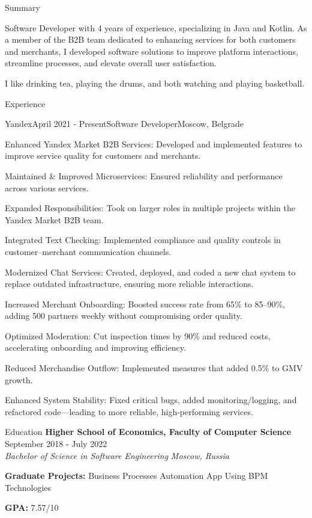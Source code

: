 \documentclass[
	11pt, %
]{resume} %
\begin{document}
	
\begin{rSection}{Summary}
	
Software Developer with 4 years of experience, specializing in Java and Kotlin. As a member of the B2B team dedicated to enhancing services for both customers and merchants, I developed software solutions to improve platform interactions, streamline processes, and elevate overall user satisfaction.

I like drinking tea, playing the drums, and both watching and playing basketball.
\end{rSection}

\begin{rSection}{Experience}

\begin{rSubsection}{Yandex}{April 2021 - Present}{Software Developer}{Moscow, Belgrade}
	\item Enhanced Yandex Market B2B Services: Developed and implemented features to improve service quality for customers and merchants.
	\item Maintained \& Improved Microservices: Ensured reliability and performance across various services.
	\item Expanded Responsibilities: Took on larger roles in multiple projects within the Yandex Market B2B team.
	\item Integrated Text Checking: Implemented compliance and quality controls in customer–merchant communication channels.
	\item Modernized Chat Services: Created, deployed, and coded a new chat system to replace outdated infrastructure, ensuring more reliable interactions.
	\item Increased Merchant Onboarding: Boosted success rate from 65\% to 85–90\%, adding 500 partners weekly without compromising order quality.
	\item Optimized Moderation: Cut inspection times by 90\% and reduced costs, accelerating onboarding and improving efficiency.
	\item Reduced Merchandise Outflow: Implemented measures that added 0.5\% to GMV growth.
	\item Enhanced System Stability: Fixed critical bugs, added monitoring/logging, and refactored code—leading to more reliable, high-performing services.
\end{rSubsection}
\end{rSection}

\begin{rSection}{Education}
	\textbf{Higher School of Economics, Faculty of Computer Science} \hfill {September 2018 - July 2022} \\
	\textit{Bachelor of Science in Software Engineering} \hfill \textit{Moscow, Russia}
	
	\textbf{Graduate Projects:} Business Processes Automation App Using BPM Technologies
	
	\textbf{GPA:} 7.57/10
\end{rSection}
\end{document}
